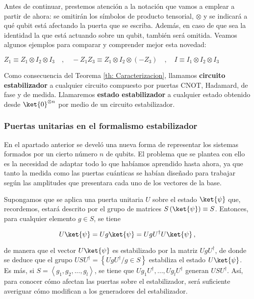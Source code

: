 \documentclass[11pt,a4paper,twoside,pdf]{article}
\numberwithin{equation}{section}
\begin{document}
		Antes de continuar, prestemos atención a la notación que vamos a emplear a partir de ahora: se omitirán los símbolos de producto tensorial, $\otimes$ y se indicará a qué qubit está afectando la puerta que se escriba. Además, en caso de que sea la identidad la que está actuando sobre un qubit, también será omitida. Veamos algunos ejemplos para comparar y comprender mejor esta novedad:
		
			\begin{center} 
				{ \( Z_1 \equiv Z_1\otimes I_2 \otimes I_3 \quad , \quad
					-Z_1Z_3 \equiv Z_1\otimes I_2 \otimes (-Z_3) \quad , \quad I \equiv I_1\otimes I_2 \otimes I_3  \) } 
			\end{center}
		
		Como consecuencia del Teorema \ref{th: Caracterizacion}, llamamos \textbf{circuito estabilizador} a cualquier circuito compuesto por puertas CNOT, Hadamard, de fase y de medida. Llamaremos \textbf{estado estabilizador} a cualquier estado obtenido desde $\ket{0}^{\otimes n}$ por medio de un circuito estabilizador.
		
	
		\subsubsection{Puertas unitarias en el formalismo estabilizador}
		
		En el apartado anterior se develó una nueva forma de representar los sistemas formados por un cierto número $n$ de qubits. El problema que se plantea con ello es la necesidad de adaptar todo lo que habíamos aprendido hasta ahora, ya que tanto la medida como las puertas cuánticas se habían diseñado para trabajar según las amplitudes que presentara cada uno de los vectores de la base.
		
		Supongamos que se aplica una puerta unitaria $U$ sobre el estado $\ket{\psi}$ que, recordemos, estará descrito por el grupo de matrices $S\left( \ket{\psi}\right) \equiv S$. Entonces, para cualquier elemento $g \in S $, se tiene
		
			\begin{equation}
				U\ket{\psi} = Ug\ket{\psi}=UgU^{\dagger}U\ket{\psi} \, ,
			\end{equation}  
		
		\noindent de manera que el vector $U\ket{\psi}$ es estabilizado por la matriz $UgU^{\dagger}$, de donde se deduce que el grupo $USU^{\dagger}=\left\{UgU^{\dagger} / g\in S \right\}$ estabiliza el estado $U\ket{\psi}$. Es más, si $S=\left< g_1,g_2,...,g_l\right> $, se tiene que $Ug_1U^{\dagger},...,Ug_lU^{\dagger}$ generan $USU^{\dagger}$. Así, para conocer cómo afectan las puertas sobre el estabilizador, será suficiente averiguar cómo modifican a los generadores del estabilizador.
		
\end{document}
